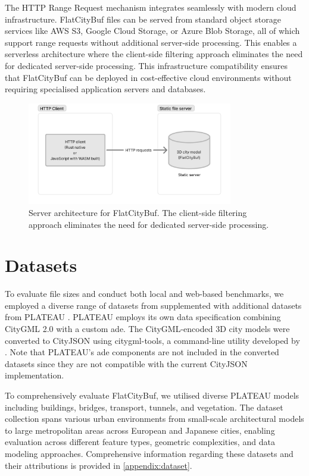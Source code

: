 The HTTP Range Request mechanism integrates seamlessly with modern cloud infrastructure. FlatCityBuf files can be served from standard object storage services like AWS S3, Google Cloud Storage, or Azure Blob Storage, all of which support range requests without additional server-side processing. This enables a serverless architecture where the client-side filtering approach eliminates the need for dedicated server-side processing. This infrastructure compatibility ensures that FlatCityBuf can be deployed in cost-effective cloud environments without requiring specialised application servers and databases.

\begin{figure}[ht]
  \centering
  \includegraphics[width=0.8\textwidth]{figs/result_analysis/server_architecture_fcb.png}
  \caption{Server architecture for FlatCityBuf. The client-side filtering approach eliminates the need for dedicated server-side processing.}
  \label{fig:result:cross_platform_implementation:server_architecture}
\end{figure}
\section{Datasets}
\label{result:dataset}

To evaluate file sizes and conduct both local and web-based benchmarks, we employed a diverse range of datasets from \citet{ledoux_2024} supplemented with additional datasets from PLATEAU \citep{plateau}. PLATEAU employs its own data specification combining CityGML 2.0 \citep{CityGML} with a custom \ac{ade}. The CityGML-encoded 3D city models were converted to CityJSON using citygml-tools, a command-line utility developed by \citet{citygml_tools}. Note that PLATEAU's \ac{ade} components are not included in the converted datasets since they are not compatible with the current CityJSON implementation.

To comprehensively evaluate FlatCityBuf, we utilised diverse PLATEAU models including buildings, bridges, transport, tunnels, and vegetation. The dataset collection spans various urban environments from small-scale architectural models to large metropolitan areas across European and Japanese cities, enabling evaluation across different feature types, geometric complexities, and data modeling approaches. Comprehensive information regarding these datasets and their attributions is provided in \autoref{appendix:dataset}.

